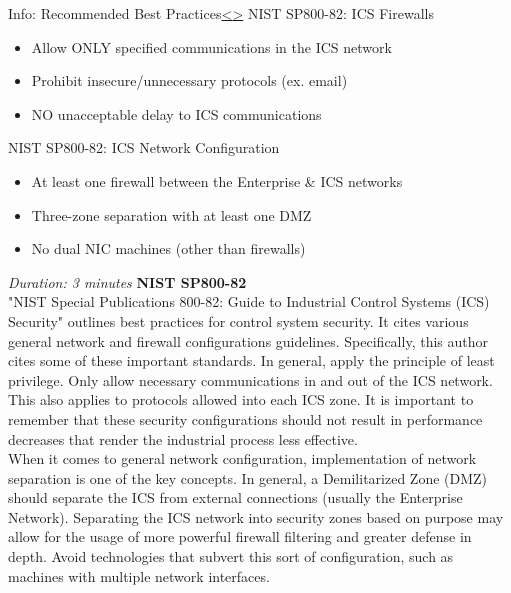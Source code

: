 \documentclass[12pt]{extarticle}
\newenvironment{instructionblock}{\Large\bgroup}{\egroup}
\newcommand{\bi}{\begin{itemize}}
\newcommand{\ei}{\end{itemize}}
\newcounter{next}
\newcounter{prev}
\begin{document}
\pagebreak
{}
\begin{slide}{Info: Recommended Best Practices}{\hyperref[slide \theprev]{\textless}\hyperref[slide \thenext]{\textgreater}}
	\begin{instructionblock}
		NIST SP800-82: ICS Firewalls
		\bi
			\item Allow ONLY specified communications in the ICS network
			\item Prohibit insecure/unnecessary protocols (ex. email)
			\item NO unacceptable delay to ICS communications
		\ei
		NIST SP800-82: ICS Network Configuration
		\bi
			\item At least one firewall between the Enterprise \& ICS networks
			\item Three-zone separation with at least one DMZ
			\item No dual NIC machines (other than firewalls)
		\ei
	\end{instructionblock}
\end{slide}
\textit{Duration: 3 minutes}
\vfill
\noindent
\textbf{NIST SP800-82}\\
"NIST Special Publications 800-82: Guide to Industrial Control Systems (ICS) Security"\cite{Stouffer2014}  outlines best practices for control system security. It cites various general network and firewall configurations guidelines. Specifically, this author cites some of these important standards. In general, apply the principle of least privilege. Only allow necessary communications in and out of the ICS network. This also applies to protocols allowed into each ICS zone. It is important to remember that these security configurations should not result in performance decreases that render the industrial process less effective.\\
When it comes to general network configuration, implementation of network separation is one of the key concepts. In general, a Demilitarized Zone (DMZ) should separate the ICS from external connections (usually the Enterprise Network). Separating the ICS network into security zones based on purpose may allow for the usage of more powerful firewall filtering and greater defense in depth. Avoid technologies that subvert this sort of configuration, such as machines with multiple network interfaces.\cite{Stouffer2014} 
\pagebreak

\end{document}
